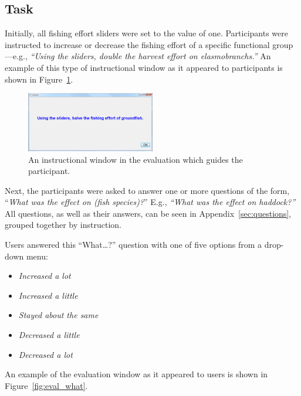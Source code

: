 \subsection{Task}

Initially, all fishing effort sliders were set to the value of one.  Participants were instructed to increase or decrease the fishing effort of a specific functional group---e.g., \textit{``Using the sliders, double the harvest effort on elasmobranchs.''}  An example of this type of instructional window as it appeared to participants is shown in Figure~\ref{fig:eval_inst}.

\begin{figure}[h]
	\centering
	\includegraphics[width=0.5\textwidth]{figures/png/eval_instr.png}
	\caption[An instructional window in the evaluation which guides the participant]{An instructional window in the evaluation which guides the participant.}
	\label{fig:eval_inst}
\end{figure}

Next, the participants were asked to answer one or more questions of the form, ``\textit{What was the effect on (fish species)?}''  E.g., \textit{``What was the effect on haddock?''}  All questions, as well as their answers, can be seen in Appendix~\ref{sec:questions}, grouped together by instruction.  %

Users answered this ``What\ldots?'' question with one of five options from a drop-down menu:
\begin{itemize}
\item \textit{Increased a lot}
\item \textit{Increased a little}
\item \textit{Stayed about the same}
\item \textit{Decreased a little}
\item \textit{Decreased a lot}
\end{itemize}
An example of the evaluation window as it appeared to users is shown in Figure~\ref{fig:eval_what}.

